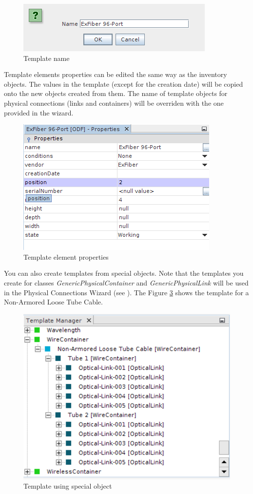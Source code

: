 \documentclass[a4paper]{article}
\begin{document}
	\begin{figure}[h!]
		\centering
		\includegraphics[width=0.6\linewidth]{img/template_manager_template_name.png}
		\caption{Template name}
		\label{fig:template_manager_name}
	\end{figure}
	
	Template elements properties can be edited the same way as the inventory objects. The values in the template (except for the creation date) will be copied onto the new objects created from them. The name of template objects for physical connections (links and containers) will be overriden with the one provided in the wizard.
	\newpage
	\begin{figure}[h!]
		\centering
		\includegraphics[width=0.6\linewidth]{img/template_manager_template_properties.png}
		\caption{Template element properties}
		\label{fig:template_manager_template_properties}
	\end{figure}
	
	You can also create templates from special objects. Note that the templates you create for classes \textit{GenericPhysicalContainer} and \textit{GenericPhysicalLink} will be used in the Physical Connections Wizard (see \textbf{}). The Figure \ref{fig:template_with_special_objects} shows the template for a Non-Armored Loose Tube Cable. 
	
	\begin{figure}[h!]
		\centering
		\includegraphics[width=0.6\linewidth]{img/template_with_special_objects.png}
		\caption{Template using special object}
		\label{fig:template_with_special_objects}
	\end{figure}
	
\end{document}

